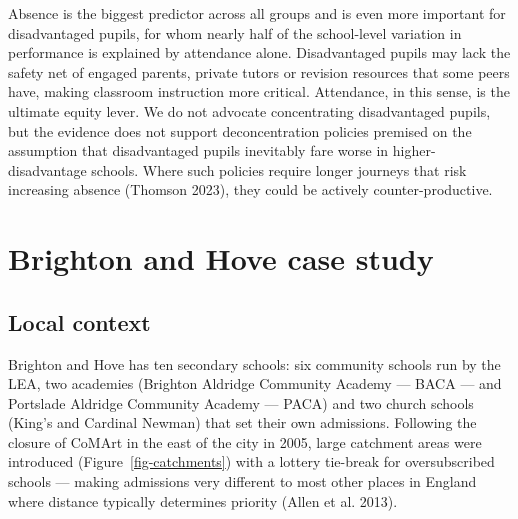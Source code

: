 \documentclass[
  12pt,
  titlepage]{article}
\begin{document}
Absence is the biggest predictor across all groups and is even more
important for disadvantaged pupils, for whom nearly half of the
school-level variation in performance is explained by attendance alone.
Disadvantaged pupils may lack the safety net of engaged parents, private
tutors or revision resources that some peers have, making classroom
instruction more critical. Attendance, in this sense, is the ultimate
equity lever. We do not advocate concentrating disadvantaged pupils, but
the evidence does not support deconcentration policies premised on the
assumption that disadvantaged pupils inevitably fare worse in
higher-disadvantage schools. Where such policies require longer journeys
that risk increasing absence (Thomson 2023), they could be actively
counter-productive.

\section{Brighton and Hove case
study}\label{brighton-and-hove-case-study}

\subsection{Local context}\label{local-context}

Brighton and Hove has ten secondary schools: six community schools run
by the LEA, two academies (Brighton Aldridge Community Academy --- BACA
--- and Portslade Aldridge Community Academy --- PACA) and two church
schools (King's and Cardinal Newman) that set their own admissions.
Following the closure of CoMArt in the east of the city in 2005, large
catchment areas were introduced (Figure~\ref{fig-catchments}) with a
lottery tie-break for oversubscribed schools --- making admissions very
different to most other places in England where distance typically
determines priority (Allen et al. 2013).
\end{document}

